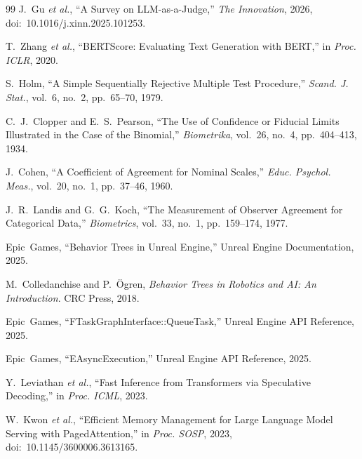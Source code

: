 \documentclass[conference]{IEEEtran}
\begin{document}
\begin{thebibliography}{99}
J.~Gu \emph{et al.}, ``A Survey on LLM-as-a-Judge,'' \emph{The
Innovation}, 2026, doi:~10.1016/j.xinn.2025.101253.

T.~Zhang \emph{et al.}, ``BERTScore: Evaluating Text Generation with
BERT,'' in \emph{Proc. ICLR}, 2020.

S.~Holm, ``A Simple Sequentially Rejective Multiple Test Procedure,''
\emph{Scand. J. Stat.}, vol.~6, no.~2, pp.~65--70, 1979.

C.~J.~Clopper and E.~S.~Pearson, ``The Use of Confidence or Fiducial
Limits Illustrated in the Case of the Binomial,'' \emph{Biometrika},
vol.~26, no.~4, pp.~404--413, 1934.

J.~Cohen, ``A Coefficient of Agreement for Nominal Scales,''
\emph{Educ. Psychol. Meas.}, vol.~20, no.~1, pp.~37--46, 1960.

J.~R.~Landis and G.~G.~Koch, ``The Measurement of Observer Agreement
for Categorical Data,'' \emph{Biometrics}, vol.~33, no.~1,
pp.~159--174, 1977.

Epic~Games, ``Behavior Trees in Unreal Engine,'' Unreal Engine
Documentation, 2025.

M.~Colledanchise and P.~\"Ogren, \emph{Behavior Trees in Robotics and
AI: An Introduction}. CRC Press, 2018.

Epic~Games, ``FTaskGraphInterface::QueueTask,'' Unreal Engine API
Reference, 2025.

Epic~Games, ``EAsyncExecution,'' Unreal Engine API Reference, 2025.

Y.~Leviathan \emph{et al.}, ``Fast Inference from Transformers via
Speculative Decoding,'' in \emph{Proc. ICML}, 2023.

W.~Kwon \emph{et al.}, ``Efficient Memory Management for Large Language
Model Serving with PagedAttention,'' in \emph{Proc. SOSP}, 2023,
doi:~10.1145/3600006.3613165.

\end{thebibliography}
\end{document}
